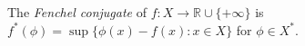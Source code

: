 The \emph{Fenchel conjugate} of $f:X\to\mathbb{R}\cup\{+\infty\}$ is $f^*(\phi)=\sup\{\phi(x)-f(x):x\in X\}$ for $\phi\in X^*$.
